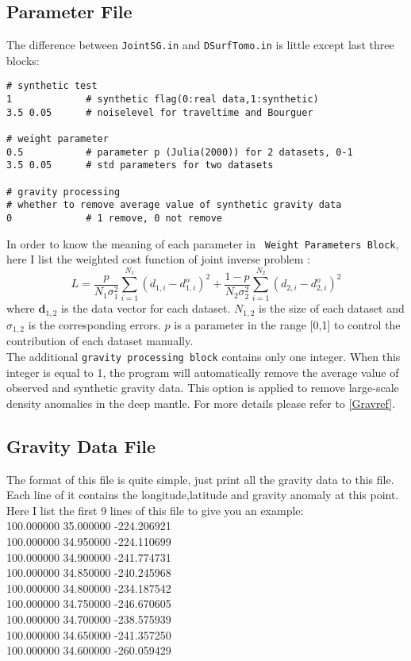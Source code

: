 \documentclass[UTF8]{article}
\begin{document}
\subsection{Parameter File}
The difference between \verb!JointSG.in! and \verb!DSurfTomo.in! 
is little except last three blocks:
\begin{lstlisting}
# synthetic test 
1             # synthetic flag(0:real data,1:synthetic)
3.5 0.05      # noiselevel for traveltime and Bourguer

# weight parameter 
0.5           # parameter p (Julia(2000)) for 2 datasets, 0-1
3.5 0.05      # std parameters for two datasets 

# gravity processing
# whether to remove average value of synthetic gravity data    
0             # 1 remove, 0 not remove 
\end{lstlisting}

In order to know the meaning of each parameter in \texttt{
Weight Parameters Block}, 
here I list the weighted cost function of joint inverse 
problem \citep{Julia2000}:
\[
    L = \frac{p}{N_1 \sigma_1^2}\sum_{i=1}^{N_1} (d_{1,i}- 
        d_{1,i}^o)^2 +   
        \frac{1-p}{N_2 \sigma_2^2} \sum_{i=1}^{N_2}
        (d_{2,i}- d_{2,i}^o)^2 \tag{1}
\]
where $\mathbf{d}_{1,2}$ is the data vector for each dataset. $N_{1,2}$
is the size of each dataset and $\sigma_{1,2}$ is the corresponding
errors. $p$ is a parameter in the range [0,1] to control the contribution
of each dataset manually. \\

The additional \texttt{gravity processing block} contains only one integer. 
When this integer is equal to 1, the program will automatically 
remove the average value of observed and synthetic gravity data. 
This option is applied to remove large-scale density anomalies 
in the deep mantle. For more details please refer to \ref{Gravref}.

\subsection{Gravity Data File}
The format of this file is quite simple, just print all 
the gravity data to this file. Each line of it contains 
the longitude,latitude and gravity anomaly at this point. \\

Here I list the first 9 lines of this file to give you
an example:\\
100.000000 35.000000 -224.206921\\
100.000000 34.950000 -224.110699\\
100.000000 34.900000 -241.774731\\
100.000000 34.850000 -240.245968\\
100.000000 34.800000 -234.187542\\
100.000000 34.750000 -246.670605\\
100.000000 34.700000 -238.575939\\
100.000000 34.650000 -241.357250\\
100.000000 34.600000 -260.059429\\
\end{document}
